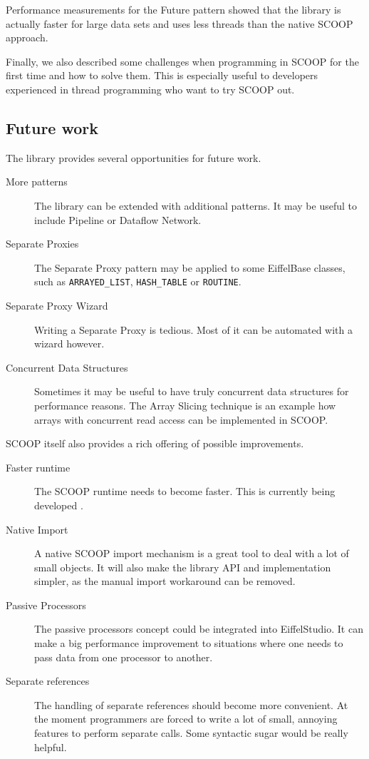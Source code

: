 \documentclass[a4paper,10pt,titlepage]{article}
\begin{document}
Performance measurements for the Future pattern showed that the library is actually faster for large data sets and uses less threads than the native SCOOP approach.

Finally, we also described some challenges when programming in SCOOP for the first time and how to solve them.
This is especially useful to developers experienced in thread programming who want to try SCOOP out.

\subsection{Future work}

The library provides several opportunities for future work.

\begin{description}
 \item [More patterns] The library can be extended with additional patterns.
 It may be useful to include Pipeline or Dataflow Network.
 \item [Separate Proxies] The Separate Proxy pattern may be applied to some EiffelBase classes, such as \lstinline!ARRAYED_LIST!, \lstinline!HASH_TABLE! or \lstinline!ROUTINE!.
 \item [Separate Proxy Wizard] Writing a Separate Proxy is tedious. Most of it can be automated with a wizard however.
 \item [Concurrent Data Structures] Sometimes it may be useful to have truly concurrent data structures for performance reasons.
The Array Slicing technique \cite{paper:array-slicing} is an example how arrays with concurrent read access can be implemented in SCOOP.
\end{description}

SCOOP itself also provides a rich offering of possible improvements.

\begin{description}
 \item [Faster runtime] The SCOOP runtime needs to become faster. 
 This is currently being developed \cite{thesis:scottwest}.
 \item [Native Import] A native SCOOP import mechanism is a great tool to deal with a lot of small objects.
 It will also make the library API and implementation simpler, as the manual import workaround can be removed.
 \item [Passive Processors] The passive processors concept \cite{paper:passive-processors} could be integrated into EiffelStudio.
 It can make a big performance improvement to situations where one needs to pass data from one processor to another.
 \item [Separate references] The handling of separate references should become more convenient.
 At the moment programmers are forced to write a lot of small, annoying features to perform separate calls.
 Some syntactic sugar would be really helpful.
\end{description}
\end{document}
